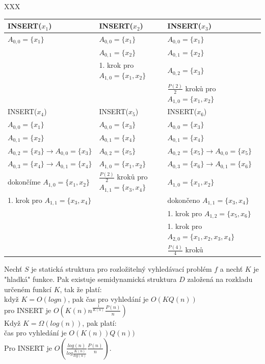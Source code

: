\par
\begin{priklad}
XXX
\par
\vspace{5mm}

\begin{tabular}{|l|l|l|}
\hline
INSERT($x_1$) & INSERT($x_2$) & INSERT($x_3$) \\
\hline
$A_{0,0} = \{x_1\}$ & $A_{0,0} = \{x_1\}$ & $A_{0,0} = \{x_1\}$ \\
 & $A_{0,1} = \{x_2\}$ & $A_{0,1} = \{x_2\}$ \\
 & 1. krok pro $A_{1,0} = \{x_1,x_2\}$ & $A_{0,2} = \{x_3\}$ \\
 & & $\frac{P(2)}{2}$ kroků pro $A_{1,0} = \{x_1,x_2\}$ \\
\hline
INSERT($x_4$) & INSERT($x_5$) & INSERT($x_6$) \\
\hline
$A_{0,0} = \{x_1\}$ & $A_{0,0} = \{x_3\}$ & $A_{0,0} = \{x_3\}$ \\
$A_{0,1} = \{x_2\}$ & $A_{0,1} = \{x_4\}$ & $A_{0,1} = \{x_4\}$ \\
$A_{0,2} = \{x_3\} \rightarrow A_{0,0} = \{x_3\}$ &
$A_{0,2} = \{x_5\}$ &
$A_{0,2} = \{x_5\} \rightarrow A_{0,0} = \{x_5\}$ \\
$A_{0,3} = \{x_4\} \rightarrow A_{0,1} = \{x_4\}$ &
$A_{1,0} = \{x_1,x_2\}$ &
$A_{0,3} = \{x_6\} \rightarrow A_{0,1} = \{x_6\}$ \\
dokončíme $A_{1,0} = \{x_1,x_2\}$ &
$\frac{P(2)}{2}$ kroků pro $A_{1,1} = \{x_3,x_4\}$ &
$A_{1,0} = \{x_1,x_2\}$ \\
1. krok pro $A_{1,1} = \{x_3,x_4\}$ & &
dokončeno $A_{1,1} = \{x_3,x_4\}$ \\
& & 1. krok pro $A_{1,2} = \{x_5,x_6\}$  \\
& & 1. krok pro $A_{2,0} = \{x_1,x_2,x_3,x_4\}$ \\
& & $\frac{P(4)}{4}$ kroků \\
\hline
\end{tabular}

\end{priklad}

\begin{theorem}
Nechť $S$ je statická struktura pro rozložitelný vyhledávací problém $f$
a nechť $K$ je "hladká" funkce. Pak existuje semidynamická struktura $D$
založená na rozkladu určeném funkcí $K$, tak že platí: \\
když $K=O(log n)$, pak čas pro vyhledání je $O(K Q(n))$ \\
			  pro INSERT je $O(K(n) n^{\frac{1}{K(n)}}
			  \frac{P(n)}{n})$ \\
Když $K = \Omega(log(n))$, pak platí: \\
čas pro vyhledání je $O(K(n)) Q(n))$ \\
Pro INSERT je $O(\frac{log(n)}{log \frac{K(n)}{log(n)} }
\frac{P(n)}{n})$.
\end{theorem}

